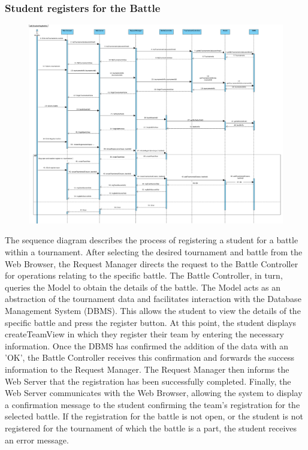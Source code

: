 \subsubsection{Student registers for the Battle}
\begin{figure}[H]
    \centering
    \includegraphics[width=1\textwidth]{SequenceDiagram/RegggBattle.png}
    \label{fig:enter-label}
\end{figure}
The sequence diagram describes the process of registering a student for a battle within a tournament. After selecting the desired tournament and battle from the Web Browser, the Request Manager directs the request to the Battle Controller for operations relating to the specific battle. The Battle Controller, in turn, queries the Model to obtain the details of the battle. The Model acts as an abstraction of the tournament data and facilitates interaction with the Database Management System (DBMS). This allows the student to view the details of the specific battle and press the register button. At this point, the student displays createTeamView in which they register their team by entering the necessary information. Once the DBMS has confirmed the addition of the data with an 'OK', the Battle Controller receives this confirmation and forwards the success information to the Request Manager. The Request Manager then informs the Web Server that the registration has been successfully completed. Finally, the Web Server communicates with the Web Browser, allowing the system to display a confirmation message to the student confirming the team's registration for the selected battle. If the registration for the battle is not open, or the student is not registered for the tournament of which the battle is a part, the student receives an error message.

